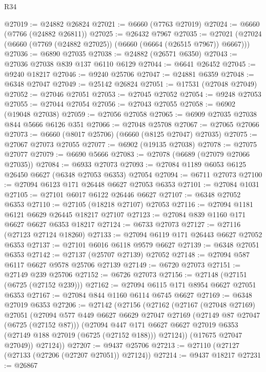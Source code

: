 \begin{lexlean}{R34}
\begin{coremodule}
@27019 := @24882 @26824
@27021 := @6660 (@7763 @27019)
@27024 := @6660 (@7766 (@24882 @26811))
@27025 := @26432 @7967
@27035 := @27021 (@27024 (@6660 (@7769 (@24882 @27025)) (@6660 (@6664 (@26515 @7967)) @6667)))
@27036 := @6890 @27035
@27038 := @24882 (@26571 @6350)
@27043 := @27036 @27038 @839 @137 @6110 @6129
@27044 := @6641 @26452
@27045 := @9240 @18217
@27046 := @9240 @25706
@27047 := @24881 @6359
@27048 := @6348 @27047
@27049 := @25142 @26824
@27051 := @17531 (@27048 @27049)
@27052 := @27046 @27051
@27053 := @27045 @27052
@27054 := @9248 @27053
@27055 := @27044 @27054
@27056 := @27043 @27055
@27058 := @6902 (@19048 @27038)
@27059 := @27056 @27058
@27065 := @6909 @27035 @27038 @844 @5666 @6126 @351
@27066 := @27048 @25708
@27067 := @27065 @27066
@27073 := @6660 (@8017 @25706) (@6660 (@8125 @27047) @27035)
@27075 := @27067 @27073 @27055
@27077 := @6902 (@19135 @27038)
@27078 := @27075 @27077
@27079 := @6690 @5666
@27083 := @27078 (@6689 (@27079 @27066 @27035))
@27084 := @6933 @27073
@27093 := @27084 @1189 @6053 @6125 @26450 @6627 (@6348 @27053 @6353) @27054
@27094 := @6711 @27073
@27100 := @27094 @6123 @171 @26448 @6627 @27053 @6353
@27101 := @27084 @1031
@27105 := @27101 @6017 @6122 @26446 @6627
@27107 := @6348 @27052 @6353
@27110 := @27105 (@18218 @27107) @27053
@27116 := @27094 @1181 @6121 @6629 @26445 @18217 @27107
@27123 := @27084 @839 @1160 @171 @6627 @6627 @6353 @18217
@27124 := @6733 @27073
@27127 := @27116 (@27123 @27124 @18260)
@27133 := @27094 @6119 @171 @26443 @6627 @27052 @6353
@27137 := @27101 @6016 @6118 @9579 @6627
@27139 := @6348 @27051 @6353
@27142 := @27137 (@25707 @27139) @27052
@27148 := @27094 @587 @6117 @6627 @9578 @25706 @27139
@27149 := @6720 @27073
@27151 := @27149 @239 @25706
@27152 := @6726 @27073
@27156 := @27148 (@27151 (@6725 (@27152 @239)))
@27162 := @27094 @6115 @171 @8954 @6627 @27051 @6353
@27167 := @27084 @844 @1160 @6114 @6745 @6627
@27169 := @6348 @27019 @6353
@27206 := @27142
    (@27156
      (@27162
        (@27167
          (@27048 @27169)
          @27051
          (@27094
            @577
            @449
            @6627
            @6629
            @27047
            @27169
            (@27149 @87 @27047 (@6725 (@27152 @87)))
            (@27094
              @447
              @171
              @6627
              @6627
              @27019
              @6353
              (@27149 @188 @27019 (@6725 (@27152 @188)))
              @27124))
          (@17675 @27047 @27049))
        @27124))
@27207 := @9437 @25706
@27213 := @27110 (@27127 (@27133 (@27206 (@27207 @27051)) @27124))
@27214 := @9437 @18217
@27231 := @26867

\end{coremodule}
\end{lexlean}
